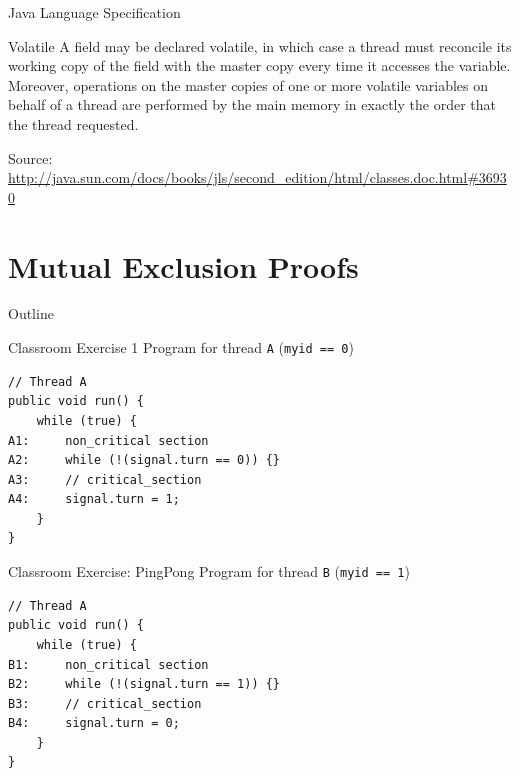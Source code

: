\begin{frame}{Java Language Specification}
  \begin{block}{Volatile}
    A field may be declared volatile, in which case a thread must
    reconcile its working copy of the field with the master copy every
    time it accesses the variable. Moreover, operations on the master
    copies of one or more volatile variables on behalf of a thread are
    performed by the main memory in exactly the order that the thread
    requested.
  \end{block}


  Source: \url{http://java.sun.com/docs/books/jls/second_edition/html/classes.doc.html\#36930}
\end{frame}


\section{Mutual Exclusion Proofs}

\begin{frame}{Outline}
  \tableofcontents[current]
\end{frame}

\begin{frame}[fragile]{Classroom Exercise 1}
  Program for thread \lstinline!A! (\lstinline!myid == 0!)


\begin{lstlisting}
// Thread A
public void run() {
    while (true) {
A1:     non_critical section
A2:     while (!(signal.turn == 0)) {}
A3:     // critical_section
A4:     signal.turn = 1;
    }
}
\end{lstlisting}
\end{frame}

\begin{frame}[fragile]{Classroom Exercise: PingPong}
  Program for thread \lstinline!B! (\lstinline!myid == 1!)


\begin{lstlisting}
// Thread A
public void run() {
    while (true) {
B1:     non_critical section
B2:     while (!(signal.turn == 1)) {}
B3:     // critical_section
B4:     signal.turn = 0;
    }
}
\end{lstlisting}
\end{frame}

